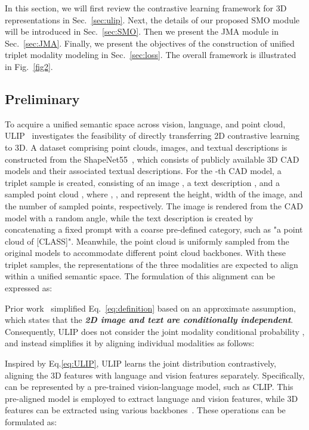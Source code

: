 \documentclass[sigconf]{acmart}
\begin{document}
In this section, we will first review the contrastive learning framework for 3D representations in Sec.~\ref{sec:ulip}.  Next, the details of our proposed SMO module will be introduced in Sec.~\ref{sec:SMO}. Then we present the
JMA module in Sec.~\ref{sec:JMA}.  Finally, we present the objectives of the construction of unified triplet modality modeling in Sec.~\ref{sec:loss}. The overall framework is illustrated in Fig.~\ref{fig2}.

\subsection{Preliminary \label{sec:ulip}}

To acquire a unified semantic space across vision, language, and point cloud, ULIP~\cite{xue2022ulip} investigates the feasibility of directly transferring 2D contrastive learning to 3D. A dataset comprising point clouds, images, and textual descriptions is constructed from the ShapeNet55~\cite{chang2015shapenet}, which consists of publicly available 3D CAD models and their associated textual descriptions.  For the -th CAD model, a triplet sample  is created, consisting of an image , a text description , and a sampled point cloud , where , , and  represent the height, width of the image, and the number of sampled points, respectively.
The image  is rendered from the CAD model with a random angle, while the text description  is created by concatenating a fixed prompt with a coarse pre-defined category, such as "a point cloud of [CLASS]". Meanwhile, the point cloud  is uniformly sampled from the original models to accommodate different point cloud backbones. With these triplet samples, the representations of the three modalities are expected to align within a unified semantic space. The formulation of this alignment can be expressed as:

Prior work~\cite{xue2022ulip, hegde2023clip} simplified Eq.~\ref{eq:definition} based on an approximate assumption, which states that the \textit{\textbf{2D image  and text  are conditionally independent}}. Consequently, ULIP does not consider the joint modality conditional probability , and instead simplifies it by aligning individual modalities as follows:

Inspired by Eq.\ref{eq:ULIP}, ULIP learns the joint distribution contrastively, aligning the 3D features with language and vision features separately. Specifically,  can be represented by a pre-trained vision-language model, such as CLIP\cite{radford2021learning}. This pre-aligned model is employed to extract language and vision features, while 3D features can be extracted using various backbones~\cite{marethinking, qi2017pointnet++, yu2022point}. These operations can be formulated as:
\end{document}
